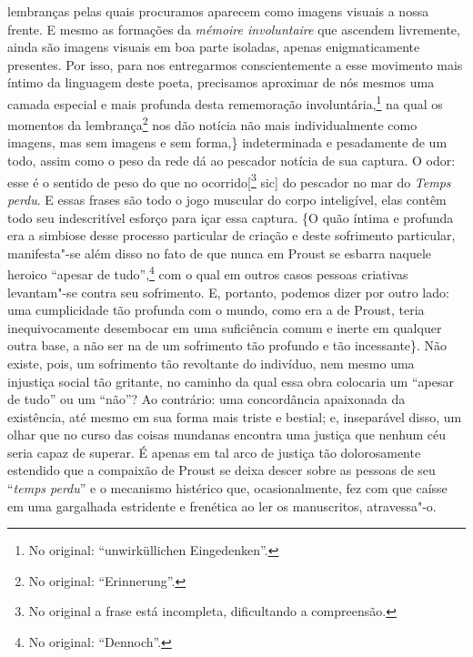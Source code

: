 lembranças pelas quais procuramos aparecem como imagens visuais a nossa
frente. E mesmo as formações da \emph{mémoire involuntaire} que ascendem
livremente, ainda são imagens visuais em boa parte isoladas, apenas
enigmaticamente presentes. Por isso, para nos entregarmos
conscientemente a esse movimento mais íntimo da linguagem deste poeta,
precisamos aproximar de nós mesmos uma camada especial e mais profunda
desta rememoração involuntária,\footnote{No original:
``unwirküllichen Eingedenken''. \versal{[N. T.]}} na qual os momentos da
lembrança\footnote{No original: ``Erinnerung''. \versal{[N. T.]}} nos dão notícia
não mais individualmente como imagens, mas sem imagens e sem forma,\}
indeterminada e pesadamente de um todo, assim como o peso da rede dá ao
pescador notícia de sua captura. O odor: esse é o sentido de peso do que
no ocorrido{[}\footnote{No original a frase está incompleta,
  dificultando a compreensão. \versal{[N. T.]}} sic{]} do pescador no mar do \emph{Temps
perdu}. E essas frases são todo o jogo muscular do corpo inteligível,
elas contêm todo seu indescritível esforço para içar essa captura. \{O
quão íntima e profunda era a simbiose desse processo particular de
criação e deste sofrimento particular, manifesta"-se além disso no fato
de que nunca em Proust se esbarra naquele heroico ``apesar de
tudo'',\footnote{No original: ``Dennoch''. \versal{[N. T.]}} com o qual em outros
casos pessoas criativas levantam"-se contra seu sofrimento. E, portanto,
podemos dizer por outro lado: uma cumplicidade tão profunda com o mundo,
como era a de Proust, teria inequivocamente desembocar em uma
suficiência comum e inerte em qualquer outra base, a não ser na de um
sofrimento tão profundo e tão incessante\}. Não existe, pois, um
sofrimento tão revoltante do indivíduo, nem mesmo uma injustiça social
tão gritante, no caminho da qual essa obra colocaria um ``apesar de
tudo'' ou um ``não''? Ao contrário: uma concordância apaixonada da
existência, até mesmo em sua forma mais triste e bestial; e, inseparável
disso, um olhar que no curso das coisas mundanas encontra uma justiça
que nenhum céu seria capaz de superar. É apenas em tal arco de justiça
tão dolorosamente estendido que a compaixão de Proust se deixa descer
sobre as pessoas de seu ``\emph{temps perdu}'' e o mecanismo histérico
que, ocasionalmente, fez com que caísse em uma gargalhada estridente e
frenética ao ler os manuscritos, atravessa"-o.

